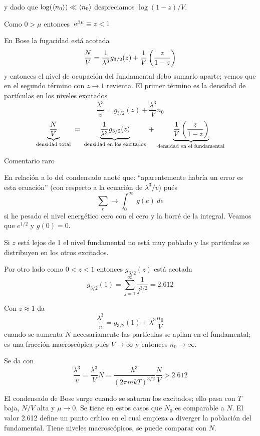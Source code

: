 \documentclass[10pt,oneside]{CBFT_book}
\begin{document}
y dado que $ \log (\braket{n_0}) \ll \braket{n_0} $ despreciamos $ \log (1-z) / V $.

Como $ 0 > \mu $ entonces $ \:\mathrm{e}^{\beta \mu} \equiv z < 1 $

En Bose la fugacidad está acotada
\[
	\frac{N}{V} = \frac{1}{\lambda^3} g_{3/2}(z) + \frac{1}{V}\left( \frac{ z }{ 1-z } \right)
\]
y entonces el nivel de ocupación del fundamental debo sumarlo aparte; vemos que en el
segundo término con $z\to 1$ revienta.
El primer término es la densidad de partículas en los niveles excitados
\[
	\frac{\lambda^3}{v} =  g_{3/2}(z) + \frac{\lambda^3}{V} n_0
\]
\[
	\underbrace{\frac{N}{V}}_{\text{ densidad total }} =
	\underbrace{\frac{1}{\lambda^3} g_{3/2}(z)}_{\text{ densidad en los excitados }} +
	\underbrace{\frac{1}{V}\left( \frac{ z }{ 1-z } \right)}_{\text{ densidad en el fundamental }}
\]

\begin{ejemplo}{Comentario raro}

En relación a lo del condensado anoté que: ``aparentemente habría un error es esta ecuación''
(con respecto a la ecuación de $\lambda^3/v$) pués
\[
	 \sum_e \longrightarrow \int_0^\infty \: g(e) \: de
\]
si he pesado el nivel energético  cero con el cero y la borré de la integral. Veamos que $e^{1/2}$
y $g(0)=0$.
 
\end{ejemplo}

Si $z$ está lejos de 1 el nivel fundamental no está muy poblado y las partículas se distribuyen
en los otros excitados.

Por otro lado como $ 0 < z < 1 $ entonces $ g_{3/2}(z) $ está acotada 
\[
	g_{3/2}(1) = \sum_{j=1}^\infty \frac{1}{j^{3/2}} = 2.612
\]

Con $z\approx 1$ da
\[
	\frac{\lambda^3}{v} = g_{3/2}(1) + \lambda^3 \frac{n_0}{V} 
\]
cuando se aumenta $N$ necesariamente las partículas se apilan en el fundamental; es una
fracción macroscópica pués $ V \to \infty $ y entonces $ n_0 \to \infty $.

Se da con 
\[
	\frac{\lambda^3}{v} = \frac{\lambda^3}{V} N = \frac{h^3}{(2\pi m kT)^{3/2}} \frac{N}{V} > 2.612
\]

El condensado de Bose surge cuando se saturan los excitados; ello pasa con $T$ baja, $N/V$
alta y $ \mu \to 0$. Se tiene en estos casos que $N_0$ es comparable a $N$.
El valor 2.612 define un punto crítico en el cual empieza a diverger la población del fundamental.
Tiene niveles macroscópicos, se puede comparar con $N$.
\end{document}
